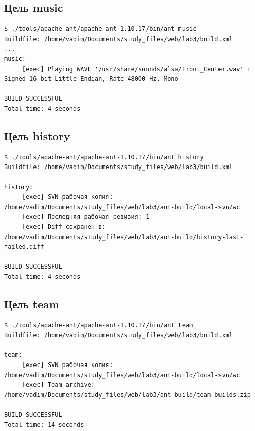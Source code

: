 \documentclass[12pt,a4paper]{article}
\begin{document}
\subsection*{Цель music}
\begin{Verbatim}[fontsize=\small,breaklines=true]
$ ./tools/apache-ant/apache-ant-1.10.17/bin/ant music
Buildfile: /home/vadim/Documents/study_files/web/lab3/build.xml
...
music:
     [exec] Playing WAVE '/usr/share/sounds/alsa/Front_Center.wav' : Signed 16 bit Little Endian, Rate 48000 Hz, Mono

BUILD SUCCESSFUL
Total time: 4 seconds
\end{Verbatim}

\subsection*{Цель history}
\begin{Verbatim}[fontsize=\small,breaklines=true]
$ ./tools/apache-ant/apache-ant-1.10.17/bin/ant history
Buildfile: /home/vadim/Documents/study_files/web/lab3/build.xml

history:
     [exec] SVN рабочая копия: /home/vadim/Documents/study_files/web/lab3/ant-build/local-svn/wc
     [exec] Последняя рабочая ревизия: 1
     [exec] Diff сохранен в: /home/vadim/Documents/study_files/web/lab3/ant-build/history-last-failed.diff

BUILD SUCCESSFUL
Total time: 4 seconds
\end{Verbatim}

\subsection*{Цель team}
\begin{Verbatim}[fontsize=\small,breaklines=true]
$ ./tools/apache-ant/apache-ant-1.10.17/bin/ant team
Buildfile: /home/vadim/Documents/study_files/web/lab3/build.xml

team:
     [exec] SVN рабочая копия: /home/vadim/Documents/study_files/web/lab3/ant-build/local-svn/wc
     [exec] Team archive: /home/vadim/Documents/study_files/web/lab3/ant-build/team-builds.zip

BUILD SUCCESSFUL
Total time: 14 seconds
\end{Verbatim}
\end{document}
